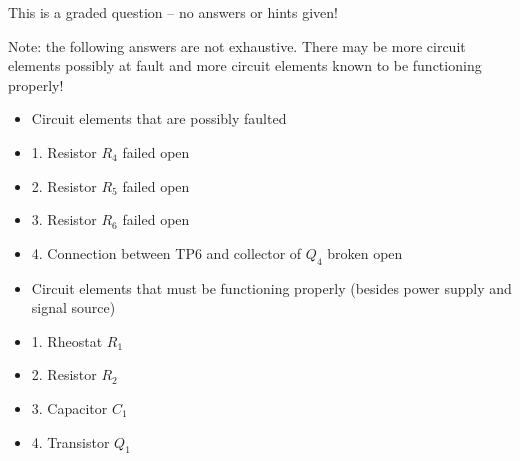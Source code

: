 \vfil 

\eject






This is a graded question -- no answers or hints given!







Note: the following answers are not exhaustive.  There may be more circuit elements possibly at fault and more circuit elements known to be functioning properly!

\begin{itemize}
\item{} Circuit elements that are possibly faulted
\item{1.} Resistor $R_4$ failed open
\item{2.} Resistor $R_5$ failed open
\item{3.} Resistor $R_6$ failed open
\item{4.} Connection between TP6 and collector of $Q_4$ broken open
\end{itemize}

\begin{itemize}
\item{} Circuit elements that must be functioning properly (besides power supply and signal source)
\item{1.} Rheostat $R_1$
\item{2.} Resistor $R_2$
\item{3.} Capacitor $C_1$
\item{4.} Transistor $Q_1$
\end{itemize}




